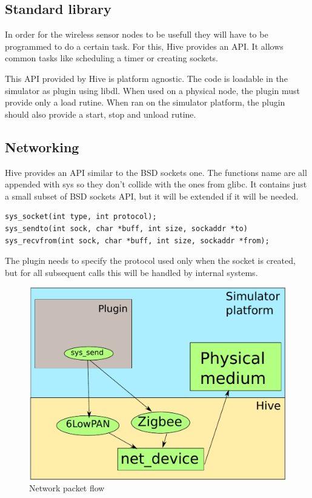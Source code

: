 
\subsection{Standard library}

In order for the wireless sensor nodes to be usefull they will have to be
programmed to do a certain task. For this, Hive provides an API. It allows
common tasks like scheduling a timer or creating sockets. 

This API provided by Hive is platform agnostic. The code is loadable in the
simulator as plugin using libdl. When used on a physical node, the plugin must
provide only a load rutine. When ran on the simulator platform, the plugin
should also provide a start, stop and unload rutine.

\subsection{Networking}

Hive provides an API similar to the BSD sockets one. The functions name are
all appended with sys so they don't collide with the ones from glibc. It
contains just a small subset of BSD sockets API, but it will be extended if
it will be needed.
\begin{lstlisting}
sys_socket(int type, int protocol);
sys_sendto(int sock, char *buff, int size, sockaddr *to)
sys_recvfrom(int sock, char *buff, int size, sockaddr *from);
\end{lstlisting}
The plugin needs to specify the protocol used only when the socket is created,
but for all subsequent calls this will be handled by internal systems. 

\begin{figure}[htb]
  \begin{center}
    \includegraphics[scale=0.75]{img/networking.pdf}
    \caption{Network packet flow}
  \end{center}
\end{figure}

